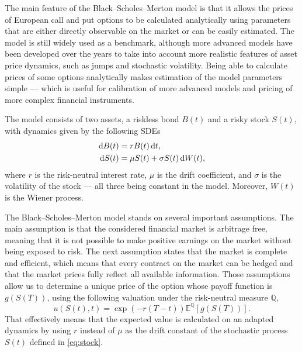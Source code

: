 \documentclass{UUThesisTemplate}
\begin{document}
\par
The main feature of the Black--Scholes--Merton model is that it allows the prices of European call and put options to be calculated analytically using parameters that are either directly observable on the market or can be easily estimated. The model is still widely used as a benchmark, although more advanced models have been developed over the years to take into account more realistic features of asset price dynamics, such as jumps and stochastic volatility. Being able to calculate prices of some options analytically makes estimation of the model parameters simple --- which is useful for calibration of more advanced models and pricing of more complex financial instruments.
\par
The model consists of two assets, a riskless bond $B(t)$ and a risky stock $S(t)$, with dynamics given by the following SDEs
\begin{align}
\dif B(t) &= r B(t) \dif t, \label{eq:bond} \\
\dif S(t) &= \mu S(t) + \sigma S(t) \dif W(t), \label{eq:stock}
\end{align}
where $r$ is the risk-neutral interest rate, $\mu$ is the drift coefficient, and $\sigma$ is the volatility of the stock --- all three being constant in the model. Moreover, $W(t)$ is the Wiener process.

\par
The Black--Scholes--Merton model stands on several important assumptions. The main assumption is that the considered financial market is arbitrage free, meaning that it is not possible to make positive earnings on the market without being exposed to risk. The next assumption states that the market is complete and efficient, which means that every contract on the market can be hedged and that the market prices fully reflect all available information. Those assumptions allow us to determine a unique price of the option whose payoff function is $g(S(T))$, using the following valuation under the risk-neutral measure $\mathbb{Q}$,
\begin{equation}
\label{eq:mc}
u(S(t), t)=\exp\left(-r(T-t)\right)\mathbb{E}^{\mathbb{Q}}\left[g(S(T))\right].
\end{equation}
That effectively means that the expected value is calculated on an adapted dynamics by using $r$ instead of $\mu$ as the drift constant of the stochastic process $S(t)$ defined in \eqref{eq:stock}. 
\end{document}
